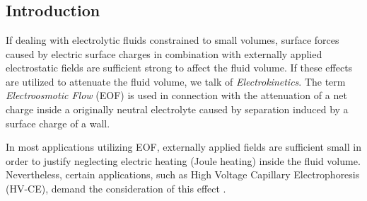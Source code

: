 \chapter{}
\noindent
{}

\section{Introduction}

If dealing with electrolytic fluids constrained to small volumes, surface forces caused by electric surface charges in combination with externally applied electrostatic fields are sufficient strong to affect the fluid volume. If these effects are utilized to attenuate the fluid volume, we talk of \textit{Electrokinetics}. The term \textit{Electroosmotic Flow} (EOF) is used in connection with the attenuation of a net charge inside a originally neutral electrolyte caused by separation induced by a surface charge of a wall.

In most applications utilizing EOF, externally applied fields are sufficient small in order to justify neglecting electric heating (Joule heating) inside the fluid volume. Nevertheless, certain applications, such as High Voltage Capillary Electrophoresis (HV-CE), demand the consideration of this effect \cite{KnoMcC1994}.

